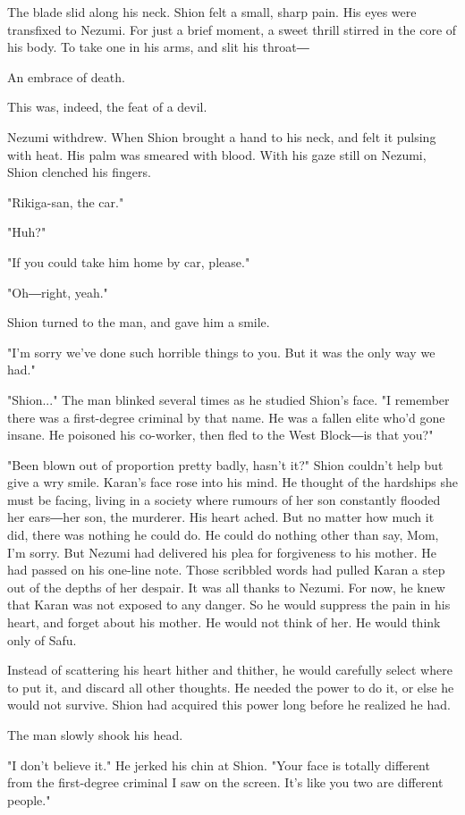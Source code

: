 The blade slid along his neck. Shion felt a small, sharp pain. His eyes
were transfixed to Nezumi. For just a brief moment, a sweet thrill
stirred in the core of his body. To take one in his arms, and slit his
throat―

An embrace of death.

This was, indeed, the feat of a devil.

Nezumi withdrew. When Shion brought a hand to his neck, and felt it
pulsing with heat. His palm was smeared with blood. With his gaze still
on Nezumi, Shion clenched his fingers.

"Rikiga-san, the car."

"Huh?"

"If you could take him home by car, please."

"Oh―right, yeah."

Shion turned to the man, and gave him a smile.

"I'm sorry we've done such horrible things to you. But it was the only
way we had."

"Shion..." The man blinked several times as he studied Shion's face. "I
remember there was a first-degree criminal by that name. He was a fallen
elite who'd gone insane. He poisoned his co-worker, then fled to the
West Block―is that you?"

"Been blown out of proportion pretty badly, hasn't it?" Shion couldn't
help but give a wry smile. Karan's face rose into his mind. He thought
of the hardships she must be facing, living in a society where rumours
of her son constantly flooded her ears―her son, the murderer. His heart
ached. But no matter how much it did, there was nothing he could do. He
could do nothing other than say, Mom, I'm sorry. But Nezumi had
delivered his plea for forgiveness to his mother. He had passed on his
one-line note. Those scribbled words had pulled Karan a step out of the
depths of her despair. It was all thanks to Nezumi. For now, he knew
that Karan was not exposed to any danger. So he would suppress the pain
in his heart, and forget about his mother. He would not think of her. He
would think only of Safu.

Instead of scattering his heart hither and thither, he would carefully
select where to put it, and discard all other thoughts. He needed the
power to do it, or else he would not survive. Shion had acquired this
power long before he realized he had.

The man slowly shook his head.

"I don't believe it." He jerked his chin at Shion. "Your face is totally
different from the first-degree criminal I saw on the screen. It's like
you two are different people."


